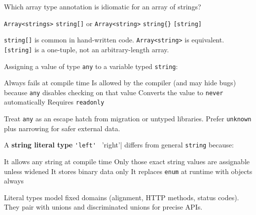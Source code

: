 \question[4]
Which array type annotation is idiomatic for an array of strings?
\begin{choices}
  \choice \lstinline[style=tsinline]|Array<strings>|
  \CorrectChoice \lstinline[style=tsinline]|string[]| or \lstinline[style=tsinline]|Array<string>|
  \choice \lstinline[style=tsinline]|string{}|
  \choice \lstinline[style=tsinline]|[string]|
\end{choices}
\begin{solution}
  \lstinline[style=tsinline]|string[]| is common in hand-written code. \lstinline[style=tsinline]|Array<string>| is equivalent. \lstinline[style=tsinline]|[string]| is a one-tuple, not an arbitrary-length array.
\end{solution}

\question[4]
Assigning a value of type \lstinline[style=tsinline]|any| to a variable typed \lstinline[style=tsinline]|string|:
\begin{choices}
  \choice Always fails at compile time
  \CorrectChoice Is allowed by the compiler (and may hide bugs) because \lstinline[style=tsinline]|any| disables checking on that value
  \choice Converts the value to \lstinline[style=tsinline]|never| automatically
  \choice Requires \lstinline[style=tsinline]|readonly|
\end{choices}
\begin{solution}
  Treat \lstinline[style=tsinline]|any| as an escape hatch from migration or untyped libraries. Prefer \lstinline[style=tsinline]|unknown| plus narrowing for safer external data.
\end{solution}

\question[4]
A \textbf{string literal type} \lstinline[style=tsinline]|'left' | 'right'| differs from general \lstinline[style=tsinline]|string| because:
\begin{choices}
  \choice It allows any string at compile time
  \CorrectChoice Only those exact string values are assignable unless widened
  \choice It stores binary data only
  \choice It replaces \lstinline[style=tsinline]|enum| at runtime with objects always
\end{choices}
\begin{solution}
  Literal types model fixed domains (alignment, HTTP methods, status codes). They pair with unions and discriminated unions for precise APIs.
\end{solution}


